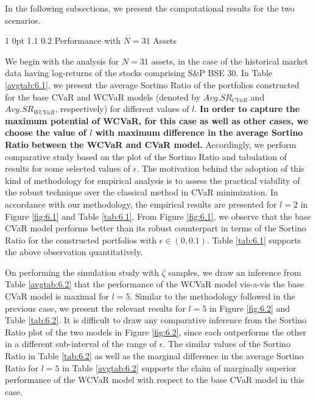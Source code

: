 \documentclass[12pt]{article}
\makeatletter
\numberwithin{equation}{section}
\renewcommand{\subsubsection}{
  \@startsection
  {subsubsection}%
  {1}%
  {0pt}%
  {1.1\baselineskip}%
  {0.2\baselineskip}%
  {\sc \centering}%
}
\makeatother
\begin{document}
In the following subsections, we present the computational results for the two scenarios.

\subsubsection{Performance with $N=31$ Assets}

We begin with the analysis for $N=31$ assets, in the case of the historical market data having log-returns of the stocks comprising S\&P BSE 30. In Table \ref{avgtab:6.1}, we present the average Sortino Ratio of the portfolios constructed for the base CVaR and WCVaR models (denoted by $Avg. SR_{CVaR}$ and $Avg. SR_{WCVaR}$, respectively) for different values of $l$. \textbf{In order to capture the maximum potential of WCVaR, for this case as well as other cases, we choose the value of $l$ with maximum difference in the average Sortino Ratio between the WCVaR and CVaR model.} Accordingly, we perform comparative study based on the plot of the Sortino Ratio and tabulation of results for some selected values of $\epsilon$. The motivation behind the adoption of this kind of methodology for empirical analysis is to assess the practical viability of the robust technique over the classical method in CVaR minimization. In accordance with our methodology, the empirical results are presented for $l=2$ in Figure \ref{fig:6.1} and Table \ref{tab:6.1}. From Figure \ref{fig:6.1}, we observe that the base CVaR model performs better than its robust counterpart in terms of the Sortino Ratio for the constructed portfolios with $\epsilon \in (0,0.1)$. Table \ref{tab:6.1} supports the above observation quantitatively.

On performing the simulation study with $\zeta$ samples, we draw an inference from Table \ref{avgtab:6.2} that the performance of the WCVaR model vis-a-vis the base CVaR model is maximal for $l=5$. Similar to the methodology followed in the previous case, we present the relevant results for $l=5$ in Figure \ref{fig:6.2} and Table \ref{tab:6.2}. It is difficult to draw any comparative inference from the Sortino Ratio plot of the two models in Figure \ref{fig:6.2}, since each outperforms the other in a different sub-interval of the range of $\epsilon$. The similar values of the Sortino Ratio in Table \ref{tab:6.2} as well as the marginal difference in the average Sortino Ratio for $l=5$ in Table \ref{avgtab:6.2} supports the claim of marginally superior performance of the WCVaR model with respect to the base CVaR model in this case.
\end{document}
